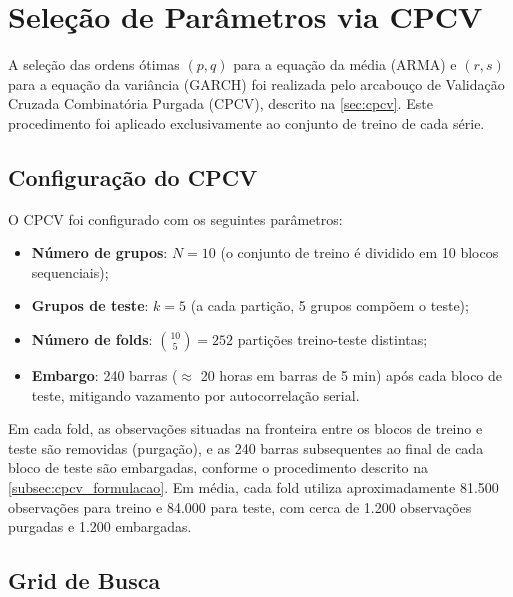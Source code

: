 \section{Seleção de Parâmetros via CPCV}
\label{sec:met_cpcv}

A seleção das ordens ótimas $(p, q)$ para a equação da média
(ARMA) e $(r, s)$ para a equação da variância (GARCH) foi realizada pelo
arcabouço de Validação Cruzada Combinatória Purgada (CPCV), descrito na
\autoref{sec:cpcv}. Este procedimento foi aplicado exclusivamente ao
conjunto de treino de cada série.

\subsection{Configuração do CPCV}
\label{subsec:met_cpcv_config}

O CPCV foi configurado com os seguintes parâmetros:

\begin{itemize}
    \item \textbf{Número de grupos}: $N = 10$ (o conjunto de treino é
          dividido em 10 blocos sequenciais);
    \item \textbf{Grupos de teste}: $k = 5$ (a cada partição, 5 grupos
          compõem o teste);
    \item \textbf{Número de folds}: $\binom{10}{5} = 252$ partições
          treino-teste distintas;
    \item \textbf{Embargo}: 240 barras ($\approx$ 20 horas em barras de
          5 min) após cada bloco de teste, mitigando vazamento por
          autocorrelação serial.
\end{itemize}

Em cada fold, as observações situadas na fronteira entre os blocos de
treino e teste são removidas (purgação), e as 240 barras subsequentes ao
final de cada bloco de teste são embargadas, conforme o procedimento
descrito na \autoref{subsec:cpcv_formulacao}. Em média, cada fold utiliza
aproximadamente 81.500 observações para treino e 84.000 para teste,
com cerca de 1.200 observações purgadas e 1.200 embargadas.

\subsection{Grid de Busca}
\label{subsec:met_grid}


